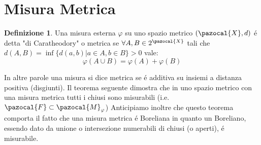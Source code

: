 \documentclass[11pt,a4paper]{report}
\theoremstyle{plain}
\theoremstyle{definition}
\newtheorem{defn}[thm]{Definizione} %
\newcommand{\M}{\pazocal{M}_\varphi}
\newcommand{\X}{\pazocal{X}}
\newcommand{\F}{\pazocal{F}}
\begin{document}
\section{Misura Metrica}
\begin{defn}
	Una misura esterna $\varphi$ su uno spazio metrico $(\X,d)$ \'e detta "di Caratheodory" o metrica se $\forall A,B \in 2^\X$ tali che\\ $d(A,B) = \inf\{d(a,b) | a \in A, b \in B\} > 0$ vale:
	\begin{equation}
		\varphi(A \cup B) = \varphi(A) + \varphi(B)
	\end{equation}
\end{defn}
In altre parole una misura si dice metrica se \'e additiva su insiemi a distanza positiva (disgiunti).
Il teorema seguente dimostra che in uno spazio metrico con una misura metrica tutti i chiusi sono misurabili (i.e. $\F \subset \M$)
Anticipiamo inoltre che questo teorema comporta il fatto che una misura metrica \'e Boreliana in quanto un Boreliano, essendo dato da unione o intersezione numerabili di chiusi (o aperti), \'e misurabile. 
\end{document}
